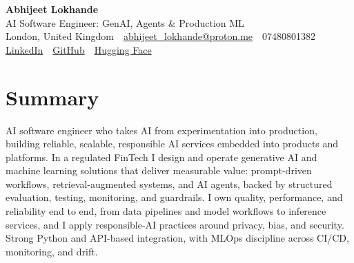 \documentclass[10pt,a4paper]{article}
\newcommand{\sep}{\,\textcolor{accent!60}{\textbar}\,}
\begin{document}
\begin{center}
  {\fontsize{24}{26}\selectfont\bfseries Abhijeet Lokhande}\\[3pt]
  {\color{accent}\large AI Software Engineer: GenAI, Agents \& Production ML}\\[5pt]
  {\small
    London, United Kingdom \sep
    \href{mailto:abhijeet_lokhande@proton.me}{abhijeet\_lokhande@proton.me} \sep
    07480801382 \\[2pt]
    \href{https://www.linkedin.com/in/ablds/}{LinkedIn} \sep
    \href{https://github.com/abhijeetscode}{GitHub} \sep
    \href{https://huggingface.co/ab-ai}{Hugging Face}
  }
\end{center}
\vspace{2pt}

\section{Summary}
AI software engineer who takes AI from experimentation into production, building reliable, scalable, responsible AI services embedded into products and platforms. In a regulated FinTech I design and operate generative AI and machine learning solutions that deliver measurable value: prompt-driven workflows, retrieval-augmented systems, and AI agents, backed by structured evaluation, testing, monitoring, and guardrails. I own quality, performance, and reliability end to end, from data pipelines and model workflows to inference services, and I apply responsible-AI practices around privacy, bias, and security. Strong Python and API-based integration, with MLOps discipline across CI/CD, monitoring, and drift.

\end{document}
